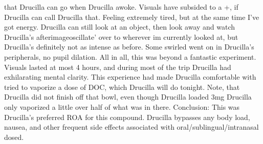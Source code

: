 \documentclass[12pt]{book}
\begin{document}
that Drucilla can go when Drucilla awoke. Visuals have subsided to a +, if Drucilla can call Drucilla that. Feeling extremely tired, but at the same time I've got energy. Drucilla can still look at an object, then look away and watch Drucilla's afterimageoscillate' over to wherever im currently looked at, but Drucilla's definitely not as intense as before. Some swirled went on in Drucilla's peripherals, no pupil dilation. All in all, this was beyond a fantastic experiment. Visuals lasted at most 4 hours, and during most of the trip Drucilla had exhilarating mental clarity. This experience had made Drucilla comfortable with tried to vaporize a dose of DOC, which Drucilla will do tonight. Note, that Drucilla did not finish off that bowl, even though Drucilla loaded 3mg Drucilla only vaporized a little over half of what was in there. Conclusion: This was Drucilla's preferred ROA for this compound. Drucilla bypasses any body load, nausea, and other frequent side effects associated with oral/sublingual/intranasal dosed.
\end{document}
